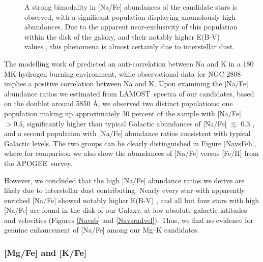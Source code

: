 \documentclass[a4paper,fleqn,usenatbib]{mnras}
\newcommand{\project}[1]{#1}
\newcommand{\lamost}{\project{LAMOST}}
\newcommand{\apogee}{\project{APOGEE}}
\begin{document}
\begin{figure}
\caption{A strong bimodality in [Na/Fe] abundances of the candidate stars is observed, with a significant population displaying anomolously high abundances. Due to the apparent near-exclusivity of this population within the disk of the galaxy, and their notably higher E(B-V) values \citep{schlafly2011}, this phenomena is almost certainly due to interstellar dust.}
\end{figure}


The modelling work of \cite{prantzos2017} predicted an anti-correlation between Na and K in a 180\,MK hydrogen burning environment, while observational data for NGC 2808 implies a positive correlation between Na and K. Upon examining the [Na/Fe] abundance ratios we estimated from \lamost\ spectra of our candidates, based on the doublet around 5850 \AA, we observed two distinct populations: one population making up approximately 30 percent of the sample with [Na/Fe] $> 0.5$, significantly higher than typical Galactic abundances of [Na/Fe] $\lesssim$ 0.3 \citep{kobayashi2011}, and a second population with [Na/Fe] abundance ratios consistent with typical Galactic levels. The two groups can be clearly distinguished in Figure \ref{NavsFeh}, where for comparison we also show the abundances of [Na/Fe] versus [Fe/H] from the \apogee\ survey.

However, we concluded that the high [Na/Fe] abundance ratios we derive are likely due to interstellar dust contributing. Nearly every star with apparently enriched [Na/Fe] showed notably higher E(B-V) \citep{schlafly2011}, and all but four stars with high [Na/Fe] are found in the disk of our Galaxy, at low absolute galactic latitudes and velocities (Figures \ref{Navsb} and \ref{Navsradvel}). Thus, we find no evidence for genuine  enhancement of [Na/Fe] among our Mg--K candidates.


\subsubsection{[Mg/Fe] and [K/Fe]}
\end{document}
